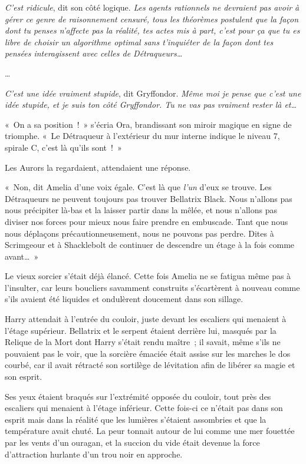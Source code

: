 \emph{C'est ridicule}, dit son côté logique. \emph{Les agents rationnels ne devraient pas avoir à gérer ce genre de raisonnement censuré, tous les théorèmes postulent que la façon dont tu penses n'affecte pas la réalité, tes actes mis à part, c'est pour ça que tu es libre de choisir un algorithme optimal sans t'inquiéter de la façon dont tes pensées interagissent avec celles de Détraqueurs…}

…

\emph{C'est une idée vraiment stupide}, dit Gryffondor. \emph{Même moi je pense que c'est une idée stupide, et je suis ton côté Gryffondor. Tu ne vas pas vraiment rester là et…}

\later

«~On a sa position~!~» s'écria Ora, brandissant son miroir magique en signe de triomphe. «~Le Détraqueur à l'extérieur du mur interne indique le niveau 7, spirale C, c'est là qu'ils sont~!~»

Les Aurors la regardaient, attendaient une réponse.

«~Non, dit Amelia d'une voix égale. C'est là que \emph{l'un} d'eux se trouve. Les Détraqueurs ne peuvent toujours pas trouver Bellatrix Black. Nous n'allons pas nous précipiter là-bas et la laisser partir dans la mêlée, et nous n'allons pas diviser nos forces pour mieux nous faire prendre en embuscade. Tant que nous nous déplaçons précautionneusement, nous ne pouvons pas perdre. Dites à Scrimgeour et à Shacklebolt de continuer de descendre un étage à la fois comme avant…~»

Le vieux sorcier s'était déjà élancé. Cette fois Amelia ne se fatigua même pas à l'insulter, car leurs boucliers savamment construits s'écartèrent à nouveau comme s'ils avaient été liquides et ondulèrent doucement dans son sillage.

\later

Harry attendait à l'entrée du couloir, juste devant les escaliers qui menaient à l'étage supérieur. Bellatrix et le serpent étaient derrière lui, masqués par la Relique de la Mort dont Harry s'était rendu maître~; il savait, même s'ils ne pouvaient pas le voir, que la sorcière émaciée était assise sur les marches le dos courbé, car il avait rétracté son sortilège de lévitation afin de libérer sa magie et son esprit.

Ses yeux étaient braqués sur l'extrémité opposée du couloir, tout près des escaliers qui menaient à l'étage inférieur. Cette fois-ci ce n'était pas dans son esprit mais dans la réalité que les lumières s'étaient assombries et que la température avait chuté. La peur tonnait autour de lui comme une mer fouettée par les vents d'un ouragan, et la succion du vide était devenue la force d'attraction hurlante d'un trou noir en approche.

